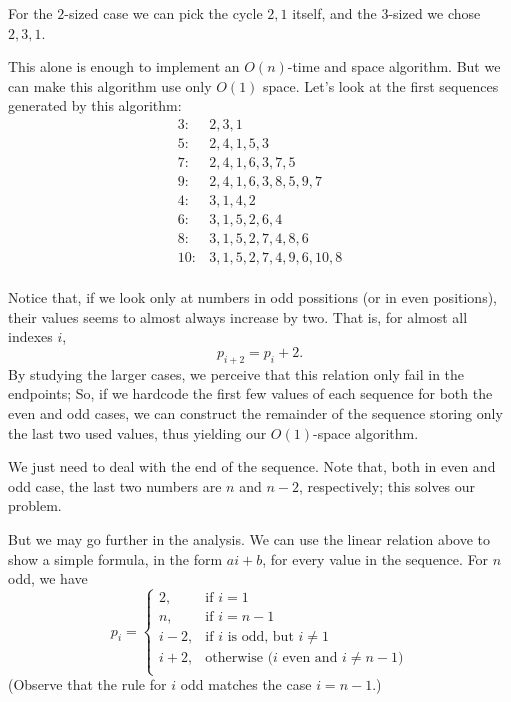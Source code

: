 \documentclass{article}
\begin{document}
For the $2$-sized case we can pick the cycle $2, 1$ itself,
and the $3$-sized we chose $2, 3, 1$.

This alone is enough to implement an $O(n)$-time and space algorithm.
But we can make this algorithm use only $O(1)$ space.
Let's look at the first sequences generated by this algorithm:
\begin{align*}
    3:& 2, 3, 1 \\
    5:& 2, 4, 1, 5, 3 \\
    7:& 2, 4, 1, 6, 3, 7, 5 \\
    9:& 2, 4, 1, 6, 3, 8, 5, 9, 7 \\
    4:& 3, 1, 4, 2 \\
    6:& 3, 1, 5, 2, 6, 4 \\
    8:& 3, 1, 5, 2, 7, 4, 8, 6 \\
    10:& 3, 1, 5, 2, 7, 4, 9, 6, 10, 8 \\
\end{align*}

Notice that, if we look only at numbers in odd possitions
(or in even positions),
their values seems to almost always increase by two.
That is, for almost all indexes $i$,
\begin{equation*}
    p_{i+2} = p_i + 2.
\end{equation*}
By studying the larger cases,
we perceive that this relation only fail in the endpoints;
So, if we hardcode the first few values of each sequence
for both the even and odd cases,
we can construct the remainder of the sequence
storing only the last two used values,
thus yielding our $O(1)$-space algorithm.

We just need to deal with the end of the sequence.
Note that, both in even and odd case,
the last two numbers are $n$ and $n-2$, respectively;
this solves our problem.

But we may go further in the analysis.
We can use the linear relation above to show a simple formula,
in the form $ai+b$,
for every value in the sequence.
For $n$ odd, we have
\begin{equation*}
    p_i = \begin{cases}
        2, &\text{if $i = 1$} \\
        n, &\text{if $i = n-1$} \\
        i - 2, &\text{if $i$ is odd, but $i \neq 1$} \\
        i + 2, &\text{otherwise ($i$ even and $i \neq n-1$)} \\
    \end{cases}
\end{equation*}
(Observe that the rule for $i$ odd matches the case $i = n-1$.)
\end{document}
